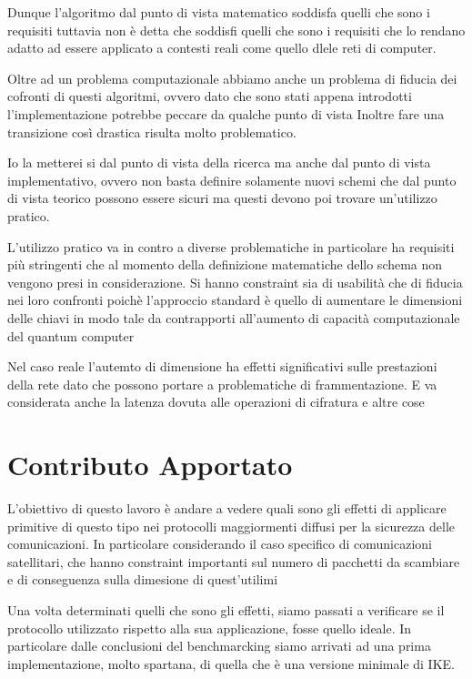 Dunque l'algoritmo dal punto di vista matematico soddisfa quelli che sono i requisiti 
tuttavia non è detta che soddisfi quelli che sono i requisiti che lo rendano adatto ad
essere applicato a contesti reali come quello dlele reti di computer.

Oltre ad un problema computazionale abbiamo anche un problema di fiducia dei cofronti di questi algoritmi, 
ovvero dato che sono stati appena introdotti l'implementazione potrebbe peccare da qualche punto di vista
Inoltre fare una transizione così drastica risulta molto problematico.






Io la metterei si dal punto di vista della ricerca ma anche dal punto di vista implementativo, ovvero 
non basta definire solamente nuovi schemi che dal punto di vista teorico possono essere sicuri 
ma questi devono poi trovare un'utilizzo pratico.

L'utilizzo pratico va in contro a diverse problematiche in particolare ha requisiti più stringenti 
che al momento della definizione matematiche dello schema non vengono presi in considerazione.
Si hanno constraint sia di usabilità che di fiducia nei loro confronti
poichè l'approccio standard è quello di aumentare le dimensioni delle chiavi in modo tale da contrapporti all'aumento di
capacità computazionale del quantum computer

Nel caso reale l'autemto di dimensione ha effetti significativi sulle prestazioni della rete
dato che possono portare a problematiche di frammentazione. E va considerata anche la latenza dovuta alle operazioni 
di cifratura e altre cose



\section*{Contributo Apportato}

L'obiettivo di questo lavoro è andare a vedere quali sono gli effetti di applicare primitive di questo 
tipo nei protocolli maggiormenti diffusi per la sicurezza delle comunicazioni.
In particolare considerando il caso specifico di comunicazioni satellitari, che hanno 
constraint importanti sul numero di pacchetti da scambiare e di conseguenza sulla dimesione di quest'utilimi

Una volta determinati quelli che sono gli effetti, siamo passati a verificare se il protocollo utilizzato 
rispetto alla sua applicazione, fosse quello ideale. 
In particolare dalle conclusioni del benchmarcking siamo arrivati ad una prima implementazione, molto spartana,
di quella che è una versione minimale di IKE.



